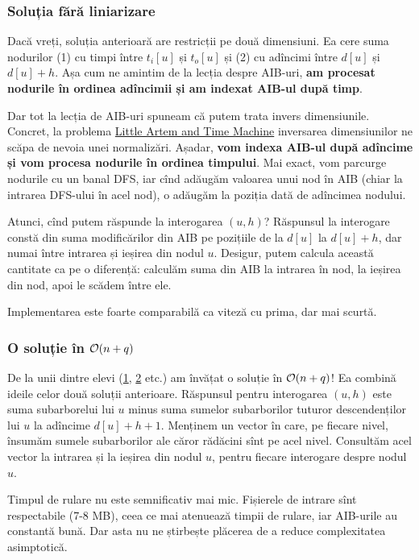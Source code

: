 \documentclass[../main.tex]{subfiles}
\begin{document}
\subsubsection*{Soluția fără liniarizare}

Dacă vreți, soluția anterioară are restricții pe două dimensiuni. Ea cere suma nodurilor (1) cu timpi între $t_i[u]$ și $t_o[u]$ și (2) cu adîncimi între $d[u]$ și $d[u] + h$. Așa cum ne amintim de la lecția despre AIB-uri, \textbf{am procesat nodurile în ordinea adîncimii și am indexat AIB-ul după timp}.

Dar tot la lecția de AIB-uri spuneam că putem trata invers dimensiunile. Concret, la problema \hyperref[problem:little-artem-and-time-machine]{Little Artem and Time Machine} inversarea dimensiunilor ne scăpa de nevoia unei normalizări. Așadar, \textbf{vom indexa AIB-ul după adîncime și vom procesa nodurile în ordinea timpului}. Mai exact, vom parcurge nodurile cu un banal DFS, iar cînd adăugăm valoarea unui nod în AIB (chiar la intrarea DFS-ului în acel nod), o adăugăm la poziția dată de adîncimea nodului.

Atunci, cînd putem răspunde la interogarea $(u, h)$? Răspunsul la interogare constă din suma modificărilor din AIB pe pozițiile de la $d[u]$ la $d[u] + h$, dar numai între intrarea și ieșirea din nodul $u$. Desigur, putem calcula această cantitate ca pe o diferență: calculăm suma din AIB la intrarea în nod, la ieșirea din nod, apoi le scădem între ele.

Implementarea este foarte comparabilă ca viteză cu prima, dar mai scurtă.

\subsubsection*{O soluție în \texorpdfstring{$\mathcal{O}(n + q)$}{O(n + q)}}

De la unii dintre elevi (\href{https://kilonova.ro/submissions/898474}{1}, \href{https://kilonova.ro/submissions/899325}{2} etc.) am învățat o soluție în $\mathcal{O}(n + q)$! Ea combină ideile celor două soluții anterioare. Răspunsul pentru interogarea $(u, h)$ este suma subarborelui lui $u$ minus suma sumelor subarborilor tuturor descendenților lui $u$ la adîncime $d[u] + h + 1$. Menținem un vector în care, pe fiecare nivel, însumăm sumele subarborilor ale căror rădăcini sînt pe acel nivel. Consultăm acel vector la intrarea și la ieșirea din nodul $u$, pentru fiecare interogare despre nodul $u$.

Timpul de rulare nu este semnificativ mai mic. Fișierele de intrare sînt respectabile (7-8 MB), ceea ce mai atenuează timpii de rulare, iar AIB-urile au constantă bună. Dar asta nu ne știrbește plăcerea de a reduce complexitatea asimptotică.
\end{document}

